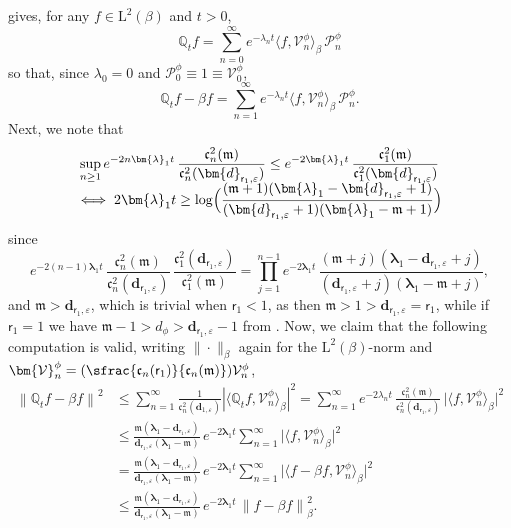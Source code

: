 \documentclass[JEP,XML,SOM,Unicode]{cedram}
\let\epsilon\varepsilon
\newcommand{\Psfrac}[2]{(\sfrac{#1}{#2})}
\theoremstyle{plain}
\theoremstyle{definition}
\newcommand{\norm}[1]{\left\lVert#1\right\rVert}
\renewcommand{\P}{\mathcal{P}}
\newcommand{\V}{\mathcal{V}}
\newcommand{\J}{\mathds{Q}}
\newcommand{\Leb}{\mathrm{L}}
\newcommand{\m}{\mathfrak{m}}
\newcommand{\dpt}{\bm{d}_{\vat,\epsilon}}
\newcommand{\dz}{{\bm{d}}_{1,\epsilon}}
\newcommand{\lam}{{\bm{\lambda}_1}}
\newcommand{\vat}{{\mathsf{r}_1}}
\let\bpsi\beta
\begin{document}
 gives, for any $f \in \Leb^2(\bpsi)$ and $t > 0$,
\begin{equation*}
\J_t f = \sum_{n=0}^{\infty} e^{-\lambda_n t} \langle f, \V_n^\phi \rangle_{\bpsi}\, \P_n^\phi
\end{equation*}
so that, since $\lambda_0=0$ and $\P_0^\phi \equiv 1 \equiv \V_0^\phi$,
\begin{equation}
\label{eq:J-t-minus}
\J_tf - \bpsi f = \sum_{n=1}^\infty e^{-\lambda_n t} \langle f, \V_n^\phi \rangle_{\bpsi}\, \P_n^\phi.
\end{equation}
Next, we note that
\begin{multline}
\label{eq:sup-t}
\sup_{n \geq 1} e^{-2n\lam t}\,\frac{\mathfrak{c}_n^2(\m)}{\mathfrak{c}_n^2(\dpt)} \leq e^{- 2\lam t}\,\frac{\mathfrak{c}_1^2(\m)}{\mathfrak{c}_1^2(\dpt)}\\[-5pt]
\iff 2\lam t \geq \log\Bigl(\frac{(\m+1)(\lam-\dpt+1)}{(\dpt+1)(\lam-\m+1)}\Bigr)
\end{multline}
since
\begin{equation*}
e^{-2(n-1)\lam t}\,\frac{\mathfrak{c}_n^2(\m)}{\mathfrak{c}_n^2(\dpt)}\,\frac{\mathfrak{c}_1^2(\dpt)}{\mathfrak{c}_1^2(\m)} = \prod_{j=1}^{n-1} e^{-2\lam t}\, \frac{(\m+j)(\lam-\dpt+j)}{(\dpt+j)(\lam-\m+j)},
\end{equation*}
and $\m > \dpt$, which is trivial when $\vat < 1$, as then $\m > 1 > \dpt = \vat$, while if $\vat =1$ we have $\m-1> d_\phi > \dpt-1$ from \cite[Prop.\,4.4(1)]{Patie-Savov-GeL}. Now, we claim that the following computation is valid, writing $\|{\cdot}\|_\bpsi$ again for the $\Leb^2(\bpsi)$-norm and $\bm{\V}_n^\phi = \Psfrac{\mathfrak{c}_n(\vat)}{\mathfrak{c}_n(\m)}\V_n^\phi$,
\begin{align*}
\norm{\J_t f - \bpsi f}^2
&\leq \sum_{n=1}^\infty \frac{1}{\mathfrak{c}_n^2(\dz)} \left| \langle \J_t f, \V_n^\phi \rangle_{\bpsi} \right|^2 = \sum_{n=1}^\infty e^{-2 \lambda_n t}\,\frac{\mathfrak{c}_n^2(\m)}{\mathfrak{c}_n^2(\dpt)}\, \bigl| \bigl\langle f, \bm{\V}_n^\phi \bigr\rangle_{\bpsi} \bigr|^2 \\
&\leq \frac{\m(\lam-\dpt)}{\dpt(\lam-\m)}\, e^{-2\lam t} \sum_{n=1}^\infty \bigl| \bigl\langle f, \bm{\V}_n^\phi \bigr\rangle_{\bpsi} \bigr|^2\\
&= \frac{\m(\lam-\dpt)}{\dpt(\lam-\m)}\, e^{-2\lam t} \sum_{n=1}^\infty \bigl| \bigl\langle f-\bpsi f, \bm{\V}_n^\phi \bigr\rangle_{\bpsi} \bigr|^2 \\
&\leq \frac{\m(\lam-\dpt)}{\dpt(\lam-\m)}\, e^{-2\lam t}\, \norm{f-\bpsi f}_\bpsi^2.
\end{align*}
\end{document}
